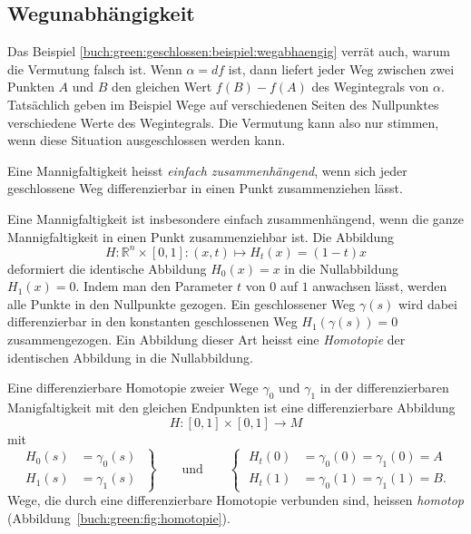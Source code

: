 %
%
\subsection{Wegunabhängigkeit}
Das Beispiel \ref{buch:green:geschlossen:beispiel:wegabhaengig}
verrät auch, warum die Vermutung falsch ist.
Wenn $\alpha=df$ ist, dann liefert jeder Weg zwischen zwei Punkten
$A$ und $B$ den gleichen Wert $f(B)-f(A)$ des Wegintegrals von $\alpha$.
Tatsächlich geben im Beispiel Wege auf verschiedenen Seiten des Nullpunktes
verschiedene Werte des Wegintegrals.
Die Vermutung kann also nur stimmen, wenn diese Situation ausgeschlossen
werden kann.

\begin{definition}
Eine Mannigfaltigkeit heisst {\em einfach zusammenhängend}, wenn sich
jeder geschlossene Weg differenzierbar in einen Punkt zusammenziehen
lässt.
\end{definition}

Eine Mannigfaltigkeit ist insbesondere einfach zusammenhängend, wenn
die ganze Mannigfaltigkeit in einen Punkt zusammenziehbar ist.
%
Die Abbildung
\[
H
\colon
\mathbb{R}^n\times [0,1]
:
(x,t) \mapsto H_t(x) = (1-t)x
\]
deformiert die identische Abbildung
\(
H_0(x)
=
x
\)
in die Nullabbildung
\(
H_1(x) = 0
\).
Indem man den Parameter $t$ von $0$ auf $1$ anwachsen lässt, werden
alle Punkte in den Nullpunkte gezogen.
Ein geschlossener Weg $\gamma(s)$ wird dabei differenzierbar in
den konstanten geschlossenen Weg $H_1(\gamma(s))=0$ zusammengezogen.
Ein Abbildung dieser Art heisst eine {\em Homotopie}
%
der identischen Abbildung in die Nullabbildung.

\begin{definition}
Eine differenzierbare Homotopie zweier Wege $\gamma_0$ und $\gamma_1$
in der differenzierbaren Manigfaltigkeit mit den gleichen Endpunkten
ist eine differenzierbare Abbildung
\[
H
\colon
[0,1]\times[0,1]
\to
M
\]
mit
\[
\left.
\begin{aligned}
H_0(s) &= \gamma_0(s)\\
H_1(s) &= \gamma_1(s)
\end{aligned}
\;
\right\}
\qquad\text{und}\qquad
\left\{\;
\begin{aligned}
H_t(0) &= \gamma_0(0) = \gamma_1(0) = A\\
H_t(1) &= \gamma_0(1) = \gamma_1(1) = B.
\end{aligned}
\right.
\]
Wege, die durch eine differenzierbare Homotopie verbunden sind,
heissen {\em homotop} (Abbildung~\ref{buch:green:fig:homotopie}).
\end{definition}

